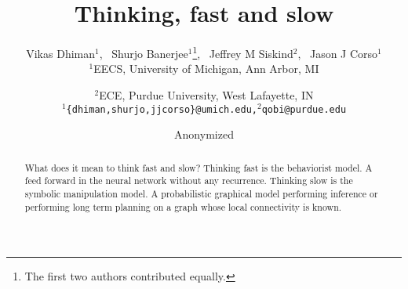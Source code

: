 \documentclass{article} %
\title{Thinking, fast and slow}
\author{Vikas Dhiman$^1$\footnotemark[1],%
  \, Shurjo Banerjee$^1$\thanks{The first two authors contributed equally.},%
  \, Jeffrey M Siskind$^2$,%
  \, Jason J Corso$^1$\\
$^1$EECS, University of Michigan,
Ann Arbor, MI
\and
$^2$ECE, Purdue University,
West Lafayette, IN\\
\texttt{$^1$\{dhiman,shurjo,jjcorso\}@umich.edu,$^2$qobi@purdue.edu} \\
}
\author{Anonymized}
\begin{document}
\maketitle
\begin{abstract}
  What does it mean to think fast and slow?
  Thinking fast is the behaviorist model. A feed forward in the neural
  network without any recurrence.
  Thinking slow is the symbolic manipulation model.
  A probabilistic graphical model performing inference or performing
  long term planning on a graph whose local connectivity is known.
\end{abstract}







{\small
{}

}
\end{document}
